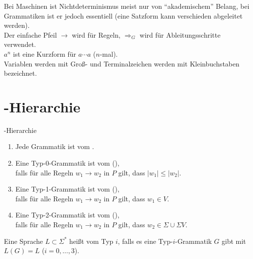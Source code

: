 \begin{Bem}
    Bei Maschinen ist Nichtdeterminismus meist nur von "`akademischem"'
    Belang, bei Grammatiken ist er jedoch essentiell
    (eine Satzform kann verschieden abgeleitet werden).\\
    Der einfache Pfeil $\rightarrow$ wird für Regeln,
    $\Rightarrow_G$ wird für Ableitungsschritte verwendet.\\
    $a^n$ ist eine Kurzform für $a \dotsb a$ ($n$-mal).\\
    Variablen werden mit Groß- und
    Terminalzeichen werden mit Kleinbuchstaben bezeichnet.
\end{Bem}

\section{%
    -Hierarchie%
}

\begin{Def}{-Hierarchie}
    \begin{enumerate}[label=\emph{Typ \arabic*}:,start=0,
                      leftmargin=20mm,labelsep=5mm]
        \item
        Jede Grammatik ist vom .

        \item
        Eine Typ-0-Grammatik ist vom 
        (),\\
        falls für alle Regeln $w_1 \rightarrow w_2$ in $P$
        gilt, dass $|w_1| \le |w_2|$.

        \item
        Eine Typ-1-Grammatik ist vom 
        (),\\
        falls für alle Regeln $w_1 \rightarrow w_2$ in $P$
        gilt, dass $w_1 \in V$.

        \item
        Eine Typ-2-Grammatik ist vom 
        (),\\
        falls für alle Regeln $w_1 \rightarrow w_2$ in $P$
        gilt, dass $w_2 \in \Sigma \cup \Sigma V$.
    \end{enumerate}
    Eine Sprache $L \subset \Sigma^\ast$ heißt
    vom Typ $i$, falls es eine Typ-$i$-Grammatik $G$ gibt mit $L(G) = L$
    ($i = 0, \dotsc, 3$).
\end{Def}

